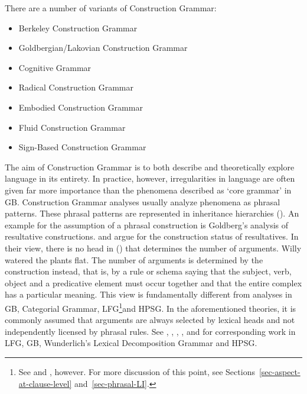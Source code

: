 There are a number of variants of Construction Grammar:
\begin{sloppypar}
\begin{itemize}
\item Berkeley Construction Grammar \citep{Fillmore88a,KF99a,FriedHSK}
\item Goldbergian/Lakovian Construction Grammar \citep{Lakoff87a-u,Goldberg95a,Goldberg2006a}
\item Cognitive Grammar \citep{Langacker87a-u,Langacker2000a,Langacker2008a-u,Dabrowska2004a}
\item Radical Construction Grammar \citep{Croft2001a}
\item Embodied Construction Grammar \citep{BC2005a}
\item Fluid Construction Grammar \citep{SDB2006a-u,SteelsFluid-ed}
\item Sign-Based Construction Grammar \citep{Sag2010b,Sag2012a}
\end{itemize}
\end{sloppypar}

\noindent
The aim of Construction Grammar is to both describe and theoretically explore language in its entirety.
In practice, however, irregularities in language are often given far more importance than the phenomena described
as `core grammar' in GB. Construction Grammar analyses usually analyze phenomena as phrasal patterns.
These phrasal patterns are represented in inheritance hierarchies (\eg \citealp{Croft2001a,Goldberg2003a}).
%
An example for the assumption of a phrasal construction is Goldberg's analysis of resultative constructions.
\citet{Goldberg95a} and \citet{GJ2004a} argue for the construction status of resultatives. In their view, there is no head
in () that determines the number of arguments.
\ea
Willy watered the plants flat.
\z
The number of arguments is determined by the construction instead, that is, by a rule or schema saying that the subject, verb, object and a predicative
element must occur together and that the entire complex has a particular meaning. This view is fundamentally different from analyses in GB\indexgb,
Categorial Grammar\indexcg, LFG\footnote{
	See  and , however. For more discussion of this point, see
        Sections~\ref{sec-aspect-at-clause-level} and~\ref{sec-phrasal-LI}.%
}\indexlfg and HPSG\indexhpsg.
In the aforementioned theories, it is commonly assumed that arguments are always selected by lexical heads and not independently licensed by phrasal
rules. See , , , , and
 for corresponding work in LFG, GB, Wunderlich's
Lexical Decomposition Grammar and HPSG. 

